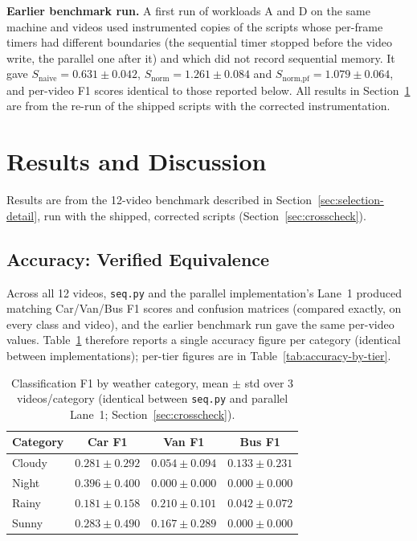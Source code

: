 \documentclass[conference]{IEEEtran}
\newcommand{\code}[1]{\texttt{#1}}
\begin{document}
\textbf{Earlier benchmark run.} A first run of workloads A and D on the
same machine and videos used instrumented copies of the scripts whose
per-frame timers had different boundaries (the sequential timer stopped
before the video write, the parallel one after it) and which did not
record sequential memory. It gave $S_{\text{naive}}=0.631\pm0.042$,
$S_{\text{norm}}=1.261\pm0.084$ and $S_{\text{norm,pf}}=1.079\pm0.064$,
and per-video F1 scores identical to those reported below. All results
in Section~\ref{sec:results} are from the re-run of the shipped scripts
with the corrected instrumentation.

\section{Results and Discussion}
\label{sec:results}

Results are from the 12-video benchmark described in
Section~\ref{sec:selection-detail}, run with the shipped, corrected
scripts (Section~\ref{sec:crosscheck}).

\subsection{Accuracy: Verified Equivalence}
Across all 12 videos, \code{seq.py} and the parallel implementation's
Lane~1 produced matching Car/Van/Bus F1 scores and confusion matrices
(compared exactly, on every class and video), and the earlier benchmark
run gave the same per-video values. Table~\ref{tab:accuracy-by-cat}
therefore reports a single accuracy figure per category (identical
between implementations); per-tier figures are in
Table~\ref{tab:accuracy-by-tier}.

\begin{table}[t]
\centering
\caption{Classification F1 by weather category, mean $\pm$ std over 3
videos/category (identical between \code{seq.py} and parallel Lane~1;
Section~\ref{sec:crosscheck}).}
\label{tab:accuracy-by-cat}
\footnotesize
\begin{tabular}{lccc}
\toprule
\textbf{Category} & \textbf{Car F1} & \textbf{Van F1} & \textbf{Bus F1} \\
\midrule
Cloudy & $0.281 \pm 0.292$ & $0.054 \pm 0.094$ & $0.133 \pm 0.231$ \\
Night  & $0.396 \pm 0.400$ & $0.000 \pm 0.000$ & $0.000 \pm 0.000$ \\
Rainy  & $0.181 \pm 0.158$ & $0.210 \pm 0.101$ & $0.042 \pm 0.072$ \\
Sunny  & $0.283 \pm 0.490$ & $0.167 \pm 0.289$ & $0.000 \pm 0.000$ \\
\bottomrule
\end{tabular}
\end{table}
\end{document}
